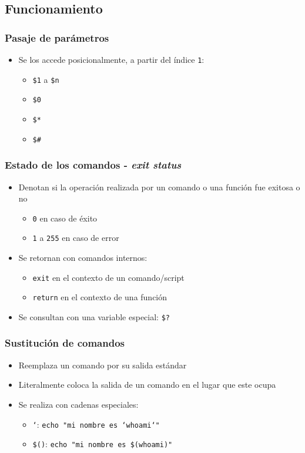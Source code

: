 \subsection{Funcionamiento}

\begin{frame}
  \frametitle{Pasaje de parámetros}
  \begin{itemize}
    \item Se los accede posicionalmente, a partir del índice \texttt{1}:
    \begin{itemize}
      \item \texttt{\$1} a \texttt{\$n}
      \item \texttt{\$0}
      \item \texttt{\$*}
      \item \texttt{\$\#}
    \end{itemize}
  \end{itemize}
\end{frame}

\begin{frame}
  \frametitle{Estado de los comandos - \textit{exit status}}
  \begin{itemize}
    \item Denotan si la operación realizada por un comando o una función
      fue exitosa o no
      \begin{itemize}
        \item \texttt{0} en caso de éxito
        \item \texttt{1} a \texttt{255} en caso de error
      \end{itemize}
    \item Se retornan con comandos internos:
    \begin{itemize}
      \item \texttt{exit} en el contexto de un comando/script
      \item \texttt{return} en el contexto de una función
    \end{itemize}
    \item Se consultan con una variable especial: \texttt{\$?}
  \end{itemize}
\end{frame}

\begin{frame}
  \frametitle{Sustitución de comandos}
  \begin{itemize}
    \item Reemplaza un comando por su salida estándar
    \item Literalmente coloca la salida de un comando en el lugar que
      este ocupa
    \item Se realiza con cadenas especiales:
    \begin{itemize}
      \item \texttt{`}: \texttt{echo \string"mi nombre es `whoami`\string"}
      \item \texttt{\$()}: \texttt{echo \string"mi nombre es \$(whoami)\string"}
    \end{itemize}
  \end{itemize}
\end{frame}

